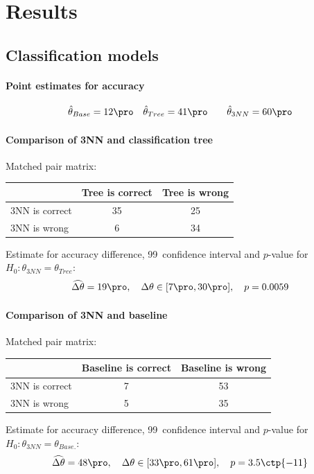 \documentclass[11pt,fleqn]{article}
\begin{document}
\section{Results}

\subsection{Classification models}

\paragraph{Point estimates for accuracy}

\begin{align*}
	& \hat \theta_{Base}= 12\pro 
	&& \hat \theta_{Tree} =41\pro 
	&&&\hat \theta_{3NN} = 60 \pro 
\end{align*}
\paragraph{Comparison of 3NN and classification tree}
Matched pair matrix:

\begin{table}[H]
	\centering
	\begin{tabular}{l|c c}
		&Tree is correct& Tree is wrong \\
		\hline
		3NN is correct &35& 25\\
		3NN is wrong& 6& 34
	\end{tabular}
\end{table}\noindent 
Estimate for accuracy difference, 99\pro\ confidence interval and \(p\)-value for \(H_0: \theta_{3NN}=\theta_{Tree}\):
\[
\widehat{\Delta \theta} = 19\pro,\quad  \Delta \theta\in[7\pro , 30\pro], \quad p = 0.0059 
\]

\paragraph{Comparison of 3NN and baseline}
Matched pair matrix:

\begin{table}[H]
	\centering
	\begin{tabular}{l|c c}
		&Baseline is correct& Baseline is wrong \\
		\hline
		3NN is correct &7& 53\\
		3NN is wrong& 5& 35
	\end{tabular}
\end{table}\noindent 
Estimate for accuracy difference, 99\pro\ confidence interval and \(p\)-value for \(H_0: \theta_{3NN}=\theta_{Base.}\):
\[
\widehat{\Delta \theta} = 48\pro,\quad  \Delta \theta\in[33\pro , 61\pro], \quad p = 3.5\ctp{-11}
\]
\end{document}
